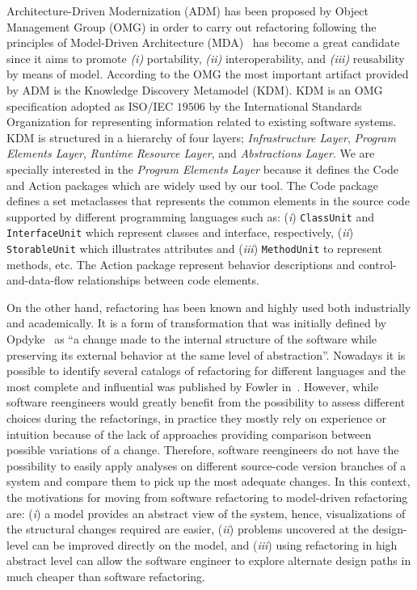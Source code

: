 Architecture-Driven Modernization (ADM) has been proposed by Object Management Group (OMG) in order to carry out refactoring following the principles of Model-Driven Architecture (MDA)~\cite{Kleppe:2003} has become a great candidate since it aims to promote \textit{(i)} portability, \textit{(ii)} interoperability, and \textit{(iii)} reusability by means of model. According to the OMG the most important artifact provided by ADM is the Knowledge Discovery Metamodel (KDM). KDM is an OMG specification adopted as ISO/IEC $19506$ by the International Standards Organization for representing information related to existing software systems.  KDM is structured in a hierarchy of four layers; \textit{Infrastructure Layer}, \textit{Program Elements Layer}, \textit{ Runtime Resource Layer}, and \textit{Abstractions Layer}. We are specially interested in the \textit{Program Elements Layer} because it defines the Code and Action packages which are widely used by our tool. The Code package defines a set metaclasses that represents the common elements in the source code supported by different programming languages such as: (\textit{i}) \texttt{ClassUnit} and \texttt{InterfaceUnit} which represent classes and interface, respectively, (\textit{ii}) \texttt{StorableUnit} which illustrates attributes and (\textit{iii}) \texttt{MethodUnit} to represent methods, etc. The Action package represent behavior descriptions and control-and-data-flow relationships between code elements.

On the other hand, refactoring has been known and highly used both industrially and academically. It is a form of transformation that was initially defined by Opdyke~\cite{Opdy92b} as ``a change made to the internal structure of the software while preserving its external behavior at the same level of abstraction''. Nowadays it is possible to identify several catalogs of refactoring for different languages and the most complete and influential was published by Fowler in~\cite{refactImpro}. 
However, while software reengineers would greatly benefit from the possibility to assess different choices during the refactorings, in practice they mostly rely on experience or intuition because of the lack of approaches providing comparison between possible variations of a change. 
Therefore, software reengineers do not have the possibility to easily apply analyses on different source-code version branches of a system and compare them to pick up the most adequate changes. In this context, the motivations for moving from software refactoring  to model-driven refactoring are: 
(\textit{i}) a model provides an abstract view of the system, hence, visualizations of the structural changes required are easier, 
(\textit{ii}) problems uncovered at the design-level can be improved directly on the model, and 
(\textit{iii}) using refactoring in high abstract level can allow the software engineer to explore alternate design paths in much cheaper than software refactoring.

